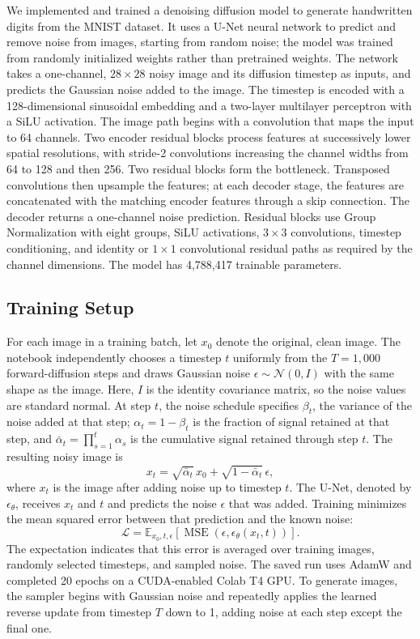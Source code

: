\documentclass[11pt, letterpaper]{article}
\begin{document}
We implemented and trained a denoising diffusion model to generate handwritten digits from the MNIST dataset. It uses a U-Net neural network to predict and remove noise from images, starting from random noise; the model was trained from randomly initialized weights rather than pretrained weights. The network takes a one-channel, $28\times28$ noisy image and its diffusion timestep as inputs, and predicts the Gaussian noise added to the image. The timestep is encoded with a 128-dimensional sinusoidal embedding and a two-layer multilayer perceptron with a SiLU activation. The image path begins with a convolution that maps the input to 64 channels. Two encoder residual blocks process features at successively lower spatial resolutions, with stride-2 convolutions increasing the channel widths from 64 to 128 and then 256. Two residual blocks form the bottleneck. Transposed convolutions then upsample the features; at each decoder stage, the features are concatenated with the matching encoder features through a skip connection. The decoder returns a one-channel noise prediction. Residual blocks use Group Normalization with eight groups, SiLU activations, $3\times3$ convolutions, timestep conditioning, and identity or $1\times1$ convolutional residual paths as required by the channel dimensions. The model has 4,788,417 trainable parameters.

\subsection{Training Setup}

For each image in a training batch, let $x_0$ denote the original, clean image. The notebook independently chooses a timestep $t$ uniformly from the $T=1{,}000$ forward-diffusion steps and draws Gaussian noise $\epsilon\sim\mathcal{N}(0,I)$ with the same shape as the image. Here, $I$ is the identity covariance matrix, so the noise values are standard normal. At step $t$, the noise schedule specifies $\beta_t$, the variance of the noise added at that step; $\alpha_t=1-\beta_t$ is the fraction of signal retained at that step, and $\bar{\alpha}_t=\prod_{s=1}^{t}\alpha_s$ is the cumulative signal retained through step $t$. The resulting noisy image is
\[
x_t=\sqrt{\bar{\alpha}_t}\,x_0+\sqrt{1-\bar{\alpha}_t}\,\epsilon,
\]
where $x_t$ is the image after adding noise up to timestep $t$. The U-Net, denoted by $\epsilon_\theta$, receives $x_t$ and $t$ and predicts the noise $\epsilon$ that was added. Training minimizes the mean squared error between that prediction and the known noise:
\[
\mathcal{L}=\mathbb{E}_{x_0,t,\epsilon}\!\left[\operatorname{MSE}\!\left(\epsilon,\epsilon_\theta(x_t,t)\right)\right].
\]
The expectation indicates that this error is averaged over training images, randomly selected timesteps, and sampled noise. The saved run uses AdamW and completed 20 epochs on a CUDA-enabled Colab T4 GPU. To generate images, the sampler begins with Gaussian noise and repeatedly applies the learned reverse update from timestep $T$ down to 1, adding noise at each step except the final one.
\newline
\end{document}

